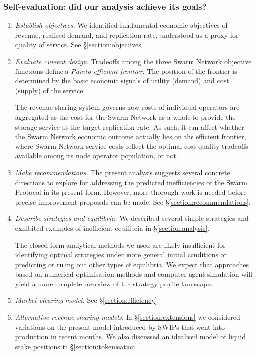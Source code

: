 \subsubsection{Self-evaluation: did our analysis achieve its goals?}

\begin{enumerate}
  \item 
    \emph{Establish objectives}. 
    We identified fundamental economic objectives of revenue, realised demand, and replication rate, understood as a proxy for quality of service. 
    See \S\ref{section:objectives}.

  \item 
    \emph{Evaluate current design}. 
    Tradeoffs among the three Swarm Network objective functions define a \emph{Pareto efficient frontier}.
    The position of the frontier is determined by the basic economic signals of utility (demand) and cost (supply) of the service.
    
    The revenue sharing system governs how costs of individual operators are aggregated as the cost for the Swarm Network as a whole to provide the storage service at the target replication rate.
    As such, it can affect whether the Swarm Network economic outcome actually lies on the efficient frontier, where Swarm Network service costs reflect the optimal cost-quality tradeoffs available among its node operator population, or not.

  \item 
    \emph{Make recommendations.} 
    The present analysis suggests several concrete directions to explore for addressing the predicted inefficiencies of the Swarm Protocol in its present form.
    However, more thorough work is needed before precise improvement proposals can be made.
    See \S\ref{section:recommendations}.

  \item 
    \emph{Describe strategies and equilibria.} 
    We described several simple strategies and exhibited examples of inefficient equilibria in \S\ref{section:analysis}.
    
    The closed form analytical methods we used are likely insufficient for identifying optimal strategies under more general initial conditions or predicting or ruling out other types of equilibria.
    We expect that approaches based on numerical optimisation methods and computer agent simulation will yield a more complete overview of the strategy profile landscape.
  
  \item 
    \emph{Market clearing model.} See \S\ref{section:efficiency}.
    
  \item 
    \emph{Alternative revenue sharing models.} 
    In \S\ref{section:extensions} we considered variations on the present model introduced by SWIPs that went into production in recent months.
    We also discussed an idealised model of liquid stake positions in \S\ref{section:tokenisation}.

\end{enumerate}




